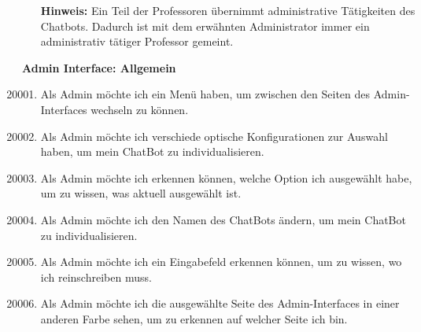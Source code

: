 \begin{enumerate}[leftmargin=*,labelindent=40pt,label=u\arabic*.]
    \item[\textbf{Hinweis:}] Ein Teil der Professoren übernimmt administrative Tätigkeiten des Chatbots. Dadurch ist mit dem erwähnten Administrator immer ein administrativ tätiger Professor gemeint.
\end{enumerate}
\newpage
\textbf{Admin Interface: Allgemein}
\begin{enumerate}[leftmargin=*,labelindent=40pt,label=u\arabic*.]
    \setcounter{enumi}{20000}
    \item Als Admin möchte ich ein Menü haben, um zwischen den Seiten des Admin-Interfaces wechseln zu können.
    \item Als Admin möchte ich verschiede optische Konfigurationen zur Auswahl haben, um mein ChatBot zu individualisieren.
    \item Als Admin möchte ich erkennen können, welche Option ich ausgewählt habe, um zu wissen, was aktuell ausgewählt ist.
    \item Als Admin möchte ich den Namen des ChatBots ändern, um mein ChatBot zu individualisieren.
    \item Als Admin möchte ich ein Eingabefeld erkennen können, um zu wissen, wo ich reinschreiben muss.
    \item Als Admin möchte ich die ausgewählte Seite des Admin-Interfaces in einer anderen Farbe sehen, um zu erkennen auf welcher Seite ich bin.
\end{enumerate}

